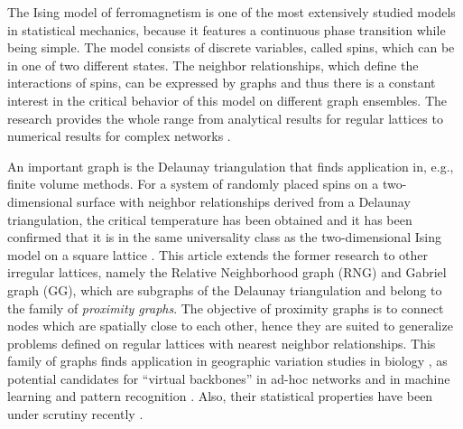 The Ising model of ferromagnetism \cite{Ising1925} is one of the
most extensively studied models in statistical mechanics, because it
features a continuous phase transition while being simple.
The model consists of discrete variables, called spins, which can be in
one of two different states.
The neighbor relationships, which define the interactions of spins, can be expressed by graphs and
thus there is a constant interest in the critical behavior of this model
on different graph ensembles. The research provides the whole range
from analytical results for regular lattices \cite{Onsager1944,Wannier1945}
to numerical results for complex networks \cite{Aleksiejuk2002260,Herrero2002SmallWorld,Herrero2004ScaleFree,Herrero2015ScaleFree}.

An important graph is the Delaunay triangulation that finds application
in, e.g., finite volume methods.
For a system of randomly placed spins on a two-dimensional surface
with neighbor relationships derived from a Delaunay triangulation,
the critical temperature has been obtained
and it has been confirmed that it is in the same universality class as the
two-dimensional Ising model on a square lattice \cite{Janke1994,Lima2000,Lima2008}.
This article extends the former research to other
irregular lattices, namely the Relative Neighborhood graph (RNG) and
Gabriel graph (GG), which are subgraphs of the Delaunay triangulation
and belong to the family of \emph{proximity graphs}.
The objective of proximity graphs is to connect nodes which are
spatially close to each other, hence they are suited
to generalize problems defined on regular lattices with nearest neighbor
relationships.
This family of graphs finds application in geographic variation studies in
biology \cite{Sokal1978,Sokal1980,Selander1975}, as potential candidates for ``virtual backbones'' in ad-hoc
networks \cite{Kuhn2003,Bose2001,Santi2005,Karp2000,jennings2002topology}
and in machine learning and pattern recognition \cite{bhattacharya1981application}.
Also, their statistical properties have been under scrutiny recently \cite{RNGCell,norrenbrock2014percolation}.

